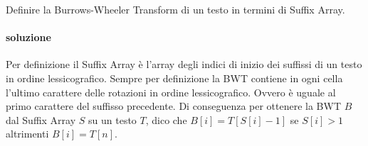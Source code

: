 Definire la Burrows-Wheeler Transform di un testo in termini di Suffix Array.

\paragraph{soluzione}

Per definizione il Suffix Array \`e l'array degli indici di inizio dei suffissi di un testo in ordine lessicografico.
Sempre per definizione la BWT contiene in ogni cella l'ultimo carattere delle rotazioni in ordine lessicografico. Ovvero \`e uguale al primo carattere del suffisso precedente.
Di conseguenza per ottenere la BWT $B$ dal Suffix Array $S$ su un testo $T$, dico che $B[i] = T[S[i] - 1]$ se $S[i] > 1$ altrimenti $B[i] = T[n]$.
